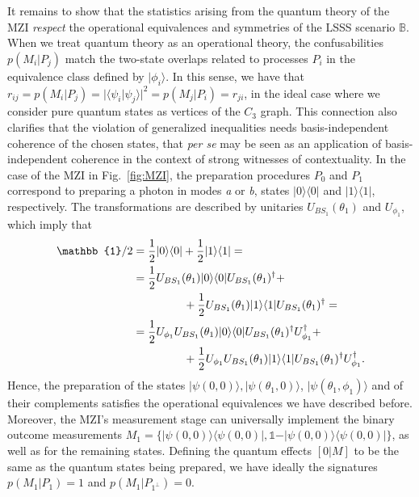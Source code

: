 \documentclass[letterpaper,onecolumn,12pt,accepted=2024-01-17]{article}
\begin{document}
It remains to show that the statistics arising from the quantum theory of the MZI \textit{respect} the operational equivalences and symmetries of the LSSS scenario $\mathbb{B}$. When we treat quantum theory as an operational theory, the confusabilities $p(M_i \vert P_j)$ match the two-state overlaps related to processes $P_i$ in the equivalence class defined by $\vert \phi_i \rangle$. In this sense, we have that $r_{ij} = p(M_i \vert P_j) = \vert \langle \psi_i \vert \psi_j \rangle \vert^2 = p(M_j \vert P_i) = r_{ji}$, in the ideal case where we consider pure quantum states as vertices of the $C_3$ graph. This connection also clarifies that the violation of generalized inequalities needs basis-independent coherence of the chosen states, that \emph{per se} may be seen as an application of basis-independent coherence in the context of strong witnesses of contextuality. In the case of the MZI in Fig.~\ref{fig:MZI}, the preparation procedures $P_0$ and $P_1$ correspond to {preparing} a photon in modes \textit{a} or \textit{b}, states $\vert 0 \rangle \langle 0 \vert$ and $\vert 1 \rangle \langle 1 \vert$, respectively. The transformations are described by unitaries $U_{BS_1}(\theta_1)$ and $U_{\phi_1}$, which imply that
\begin{align*}
    \mathbb{1}/2 &= \frac{1}{2}\vert 0 \rangle \langle 0 \vert + \frac{1}{2}\vert 1\rangle \langle 1 \vert =\\ &=\frac{1}{2}U_{BS_1}(\theta_1)\vert 0 \rangle \langle 0 \vert U_{BS_1}(\theta_1)^\dagger+\\ &\hspace{4.5em}+\frac{1}{2}U_{BS_1}(\theta_1)\vert 1\rangle \langle 1 \vert U_{BS_1}(\theta_1)^\dagger =\\ &=\frac{1}{2}U_{\phi_1}U_{BS_1}(\theta_1)\vert 0 \rangle \langle 0 \vert U_{BS_1}(\theta_1)^\dagger U_{\phi_1}^\dagger +\\
    &\hspace{4.5em}+\frac{1}{2}U_{\phi_1}U_{BS_1}(\theta_1)\vert 1\rangle \langle 1 \vert U_{BS_1}(\theta_1)^\dagger U_{\phi_1}^\dagger.
\end{align*}
Hence, the preparation of the states $\vert \psi(0,0) \rangle, \vert \psi(\theta_1,0) \rangle$, $\vert \psi(\theta_1,\phi_1) \rangle$ and of their complements satisfies the operational equivalences we have described before. Moreover, the MZI's measurement stage can universally implement the binary outcome measurements $M_1 = \{\vert \psi(0,0) \rangle \langle \psi(0,0) \vert, \mathbb{1} -\vert \psi(0,0) \rangle \langle \psi(0,0) \vert \}$, as well as for the remaining states. Defining the quantum effects {$[0 \vert M]$} to be the same as the quantum states being prepared, we have ideally the signatures $p(M_1\vert P_1) = 1$ and $p(M_1 \vert P_{1^\perp}) = 0$. 
\end{document}
